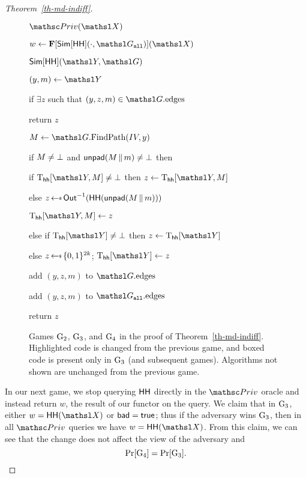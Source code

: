 \begin{proof}[Theorem~\ref{th-md-indiff}]
\begin{figure}
{			\ExptSepSpace
			\begin{algorithm}{$\PrivO(\XEDSA)$}
				\item$w \gets \construct{F}[\simulator[\HH](\cdot, \graph_{\all})](\XEDSA)$
				\item {}
			\end{algorithm}	
		}{
		\begin{algorithm}{$\simulator[\HH](\YEDSA, \graph)$}
			\item $(y, m) \gets \YEDSA$
			\item if $\exists z$ such that $(y, z, m) \in \graph.\edges$
			\item \quad return $z$
			\item $\msg \gets \graph.\ppathO(\IV, y)$
			\item {}
			\item if ${M} \neq \bot$ and $\mathsf{unpad}({M} {\,\|\,} m) \neq \bot$ then 
			\item \quad if $\Thh[\YEDSA, \msg] \neq \bot$ then $z \gets \Thh[\YEDSA, \msg]$
			\item \quad else  $z \getsr  \Out^{-1}(\HH(\UnPadF(\msg \concat m)))$
			\item \qquad $\Thh[\YEDSA, \msg] \gets z$
			\item else if $\Thh[\YEDSA] \neq \bot$ then $z \gets \Thh[\YEDSA]$
			\item else $z \getsr \bits^{2k}$; $\Thh[\YEDSA] \gets z$
			\item {}
			\item \quad {}
			\item \qquad \gamechange{$\bad \gets \true$}
			\item add $(y, z, m)$ to $\graph.\edges$
			\item add $(y, z, m)$ to $\graph_{\all}.\edges$
			\item return $z$
		\end{algorithm}
	}
	\vspace{5pt}
	\caption{Games $\textnormal{G}_2$, $\textnormal{G}_3$, and $\textnormal{G}_4$ in the proof of Theorem~\ref{th-md-indiff}. Highlighted code is changed from the previous game, and boxed code is present only in $\textnormal{G}_3$ (and subsequent games). Algorithms not shown are unchanged from the previous game.}
	\label{fig-chop-gm2}
	\label{fig-chop-gm3}
	\label{fig-chop-gm4}
\end{figure}
In our next game, we stop querying $\mathsf{HH}$ directly in the $\PrivO$ oracle and instead return
$w$, the result of our functor on the query.
We claim that in $\textnormal{G}_3$, either $w = \HH(\XEDSA)$ or $\mathsf{bad} = \mathsf{true}$; thus if the adversary wins $\textnormal{G}_3$, then in all $\PrivO$ queries we have $w = \HH(\XEDSA)$. 
From this claim, we can see that the change does not affect the view of the adversary and 
\[\Pr[\textnormal{G}_4] = \Pr[\textnormal{G}_3].\]


\end{proof}
